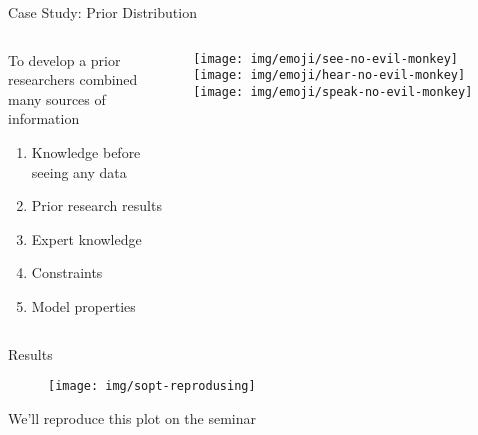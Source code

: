 \documentclass{beamer}
\begin{document}
\begin{frame}{Case Study: Prior Distribution}
\begin{columns}
\begin{column}{0.8\linewidth}
To develop a prior researchers combined many sources of information
    \begin{enumerate}
        \item Knowledge before seeing any data
        \item Prior research results
        \item Expert knowledge
        \item Constraints
        \item Model properties
    \end{enumerate}
\end{column}
\begin{column}{0.2\linewidth}
\texttt{[image: img/emoji/see-no-evil-monkey]}
\texttt{[image: img/emoji/hear-no-evil-monkey]}
\texttt{[image: img/emoji/speak-no-evil-monkey]}
\end{column}
\end{columns}
\end{frame}
\begin{frame}{Results}
    \begin{figure}
        \centering
        \texttt{[image: img/sopt-reprodusing]}
    \end{figure}
We'll reproduce this plot on the seminar
\end{frame}
\end{document}
